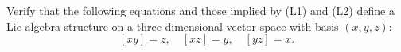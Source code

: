 Verify that the following equations and those implied by (L1) and (L2) define a Lie algebra structure on a three dimensional vector space with basis $(x, y, z)$:
$$[xy] = z, \quad [xz] = y, \quad [yz] = x.$$
